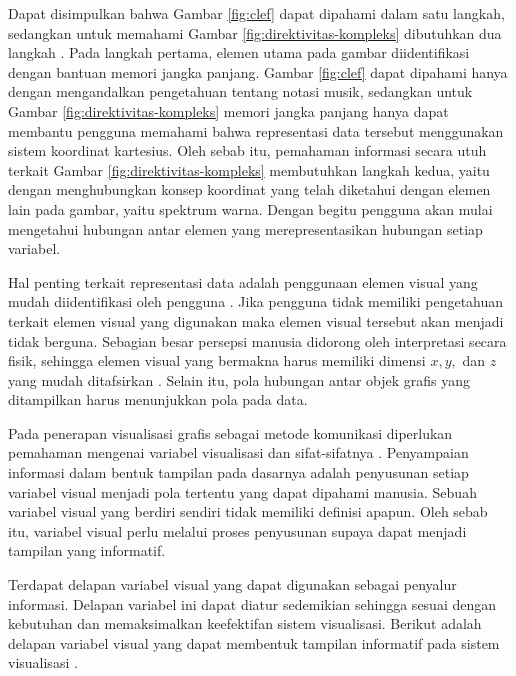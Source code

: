 Dapat disimpulkan bahwa Gambar \ref{fig:clef} dapat dipahami dalam satu langkah, sedangkan untuk memahami Gambar \ref{fig:direktivitas-kompleks} dibutuhkan dua langkah \cite{buku_visual}. Pada langkah pertama, elemen utama pada gambar diidentifikasi dengan bantuan memori jangka panjang. Gambar \ref{fig:clef} dapat dipahami hanya dengan mengandalkan pengetahuan tentang notasi musik, sedangkan untuk Gambar \ref{fig:direktivitas-kompleks} memori jangka panjang hanya dapat membantu pengguna memahami bahwa representasi data tersebut menggunakan sistem koordinat kartesius. Oleh sebab itu, pemahaman informasi secara utuh terkait Gambar \ref{fig:direktivitas-kompleks} membutuhkan langkah kedua, yaitu dengan menghubungkan konsep koordinat yang telah diketahui dengan elemen lain pada gambar, yaitu spektrum warna. Dengan begitu pengguna akan mulai mengetahui hubungan antar elemen yang merepresentasikan hubungan setiap variabel. \par 
Hal penting terkait representasi data adalah penggunaan elemen visual yang mudah diidentifikasi oleh pengguna \cite{buku_visual}. Jika pengguna tidak memiliki pengetahuan terkait elemen visual yang digunakan maka elemen visual tersebut akan menjadi tidak berguna. Sebagian besar persepsi manusia didorong oleh interpretasi secara fisik, sehingga elemen visual yang bermakna harus memiliki dimensi $x,y,$ dan $z$ yang mudah ditafsirkan \cite{buku_visual}. Selain itu, pola hubungan antar objek grafis yang ditampilkan harus menunjukkan pola pada data. \par
Pada penerapan visualisasi grafis sebagai metode komunikasi diperlukan pemahaman mengenai variabel visualisasi dan sifat-sifatnya \cite{buku_visual}. Penyampaian informasi dalam bentuk tampilan pada dasarnya adalah penyusunan setiap variabel visual menjadi pola tertentu yang dapat dipahami manusia. Sebuah variabel visual yang berdiri sendiri tidak memiliki definisi apapun. Oleh sebab itu, variabel visual perlu melalui proses penyusunan supaya dapat menjadi tampilan yang informatif. \par 
Terdapat delapan variabel visual yang dapat digunakan sebagai penyalur informasi. Delapan variabel ini dapat diatur sedemikian sehingga sesuai dengan kebutuhan dan memaksimalkan keefektifan sistem visualisasi. Berikut adalah delapan variabel visual yang dapat membentuk tampilan informatif pada sistem visualisasi \cite{buku_visual}.
